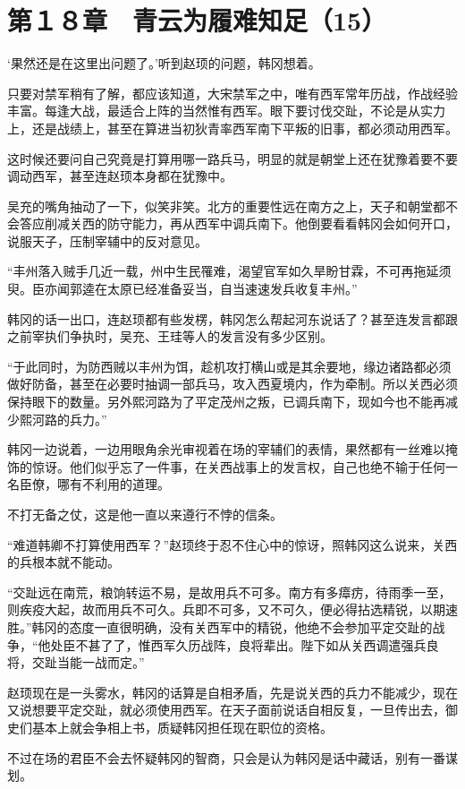 \section{第１８章　青云为履难知足（15）}

‘果然还是在这里出问题了。’听到赵顼的问题，韩冈想着。

只要对禁军稍有了解，都应该知道，大宋禁军之中，唯有西军常年历战，作战经验丰富。每逢大战，最适合上阵的当然惟有西军。眼下要讨伐交趾，不论是从实力上，还是战绩上，甚至在算进当初狄青率西军南下平叛的旧事，都必须动用西军。

这时候还要问自己究竟是打算用哪一路兵马，明显的就是朝堂上还在犹豫着要不要调动西军，甚至连赵顼本身都在犹豫中。

吴充的嘴角抽动了一下，似笑非笑。北方的重要性远在南方之上，天子和朝堂都不会答应削减关西的防守能力，再从西军中调兵南下。他倒要看看韩冈会如何开口，说服天子，压制宰辅中的反对意见。

“丰州落入贼手几近一载，州中生民罹难，渴望官军如久旱盼甘霖，不可再拖延须臾。臣亦闻郭逵在太原已经准备妥当，自当速速发兵收复丰州。”

韩冈的话一出口，连赵顼都有些发楞，韩冈怎么帮起河东说话了？甚至连发言都跟之前宰执们争执时，吴充、王珪等人的发言没有多少区别。

“于此同时，为防西贼以丰州为饵，趁机攻打横山或是其余要地，缘边诸路都必须做好防备，甚至在必要时抽调一部兵马，攻入西夏境内，作为牵制。所以关西必须保持眼下的数量。另外熙河路为了平定茂州之叛，已调兵南下，现如今也不能再减少熙河路的兵力。”

韩冈一边说着，一边用眼角余光审视着在场的宰辅们的表情，果然都有一丝难以掩饰的惊讶。他们似乎忘了一件事，在关西战事上的发言权，自己也绝不输于任何一名臣僚，哪有不利用的道理。

不打无备之仗，这是他一直以来遵行不悖的信条。

“难道韩卿不打算使用西军？”赵顼终于忍不住心中的惊讶，照韩冈这么说来，关西的兵根本就不能动。

“交趾远在南荒，粮饷转运不易，是故用兵不可多。南方有多瘴疠，待雨季一至，则疾疫大起，故而用兵不可久。兵即不可多，又不可久，便必得拈选精锐，以期速胜。”韩冈的态度一直很明确，没有关西军中的精锐，他绝不会参加平定交趾的战争，“他处臣不甚了了，惟西军久历战阵，良将辈出。陛下如从关西调遣强兵良将，交趾当能一战而定。”

赵顼现在是一头雾水，韩冈的话算是自相矛盾，先是说关西的兵力不能减少，现在又说想要平定交趾，就必须使用西军。在天子面前说话自相反复，一旦传出去，御史们基本上就会争相上书，质疑韩冈担任现在职位的资格。

不过在场的君臣不会去怀疑韩冈的智商，只会是认为韩冈是话中藏话，别有一番谋划。

